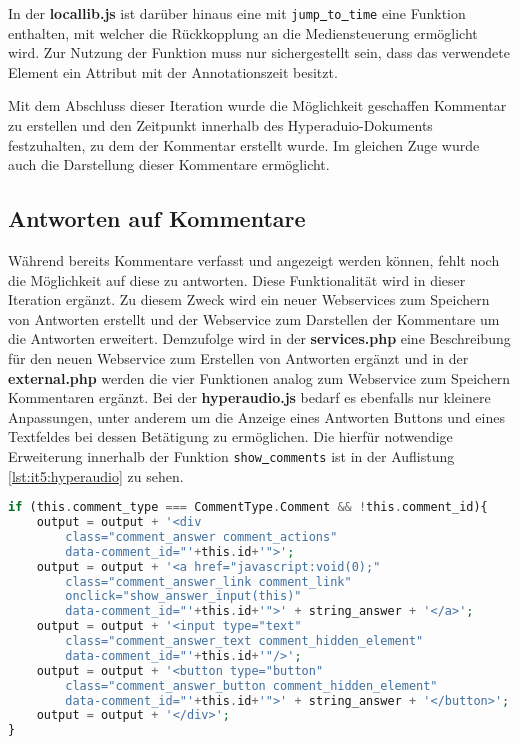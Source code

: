 In der \textbf{locallib.js} ist darüber hinaus eine mit \texttt{jump\underline{{ }}to\underline{{ }}time} eine Funktion enthalten, mit welcher die Rückkopplung an die Mediensteuerung ermöglicht wird. Zur Nutzung der Funktion muss nur sichergestellt sein, dass das verwendete Element ein Attribut mit der Annotationszeit besitzt.


Mit dem Abschluss dieser Iteration wurde die Möglichkeit geschaffen Kommentar zu erstellen und den Zeitpunkt innerhalb des Hyperaduio-Dokuments festzuhalten, zu dem der Kommentar erstellt wurde. Im gleichen Zuge wurde auch die Darstellung dieser Kommentare ermöglicht.

\subsection{Antworten auf Kommentare}
Während bereits Kommentare verfasst und angezeigt werden können, fehlt noch die Möglichkeit auf diese zu antworten. Diese Funktionalität wird in dieser Iteration ergänzt. Zu diesem Zweck wird ein neuer Webservices zum Speichern von Antworten erstellt und der Webservice zum Darstellen der Kommentare um die Antworten erweitert. Demzufolge wird in der \textbf{services.php} eine Beschreibung für den neuen Webservice zum Erstellen von Antworten ergänzt und in der \textbf{external.php} werden die vier Funktionen analog zum Webservice zum Speichern Kommentaren ergänzt. Bei der \textbf{hyperaudio.js} bedarf es ebenfalls nur kleinere Anpassungen, unter anderem um die Anzeige eines Antworten Buttons und eines Textfeldes bei dessen Betätigung zu ermöglichen. Die hierfür notwendige Erweiterung innerhalb der Funktion \texttt{show\underline{{ }}comments} ist in der Auflistung \ref{lst:it5:hyperaudio} zu sehen.

\begin{lstlisting}[language=php,
             linewidth=\textwidth,
             caption={Ausschnitt der \textbf{hyperaudio.js} in der 5. Iteration},
             label={lst:it5:hyperaudio}]
if (this.comment_type === CommentType.Comment && !this.comment_id){
    output = output + '<div
        class="comment_answer comment_actions"
        data-comment_id="'+this.id+'">';
    output = output + '<a href="javascript:void(0);"
        class="comment_answer_link comment_link"
        onclick="show_answer_input(this)"
        data-comment_id="'+this.id+'">' + string_answer + '</a>';
    output = output + '<input type="text"
        class="comment_answer_text comment_hidden_element"
        data-comment_id="'+this.id+'"/>';
    output = output + '<button type="button"
        class="comment_answer_button comment_hidden_element"
        data-comment_id="'+this.id+'">' + string_answer + '</button>';
    output = output + '</div>';
}
\end{lstlisting}

